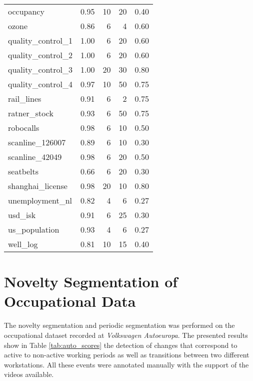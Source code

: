 \begin{table}
\begin{tabular}{lrrrr}
    occupancy &  0.95 &   10 &   20 &  0.40 \\
    ozone &  0.86 &    6 &    4 &  0.60 \\
    quality\_control\_1 &  1.00 &    6 &   20 &  0.60 \\
    quality\_control\_2 &  1.00 &    6 &   20 &  0.60 \\
    quality\_control\_3 &  1.00 &   20 &   30 &  0.80 \\
    quality\_control\_4 &  0.97 &   10 &   50 &  0.75 \\
    rail\_lines &  0.91 &    6 &    2 &  0.75 \\
    ratner\_stock &  0.93 &    6 &   50 &  0.75 \\
    robocalls &  0.98 &    6 &   10 &  0.50 \\
    scanline\_126007 &  0.89 &    6 &   10 &  0.30 \\
    scanline\_42049 &  0.98 &    6 &   20 &  0.50 \\
    seatbelts &  0.66 &    6 &   20 &  0.30 \\
    shanghai\_license &  0.98 &   20 &   10 &  0.80 \\
    unemployment\_nl &  0.82 &    4 &    6 &  0.27 \\
    usd\_isk &  0.91 &    6 &   25 &  0.30 \\
    us\_population &  0.93 &    4 &    6 &  0.27 \\
    well\_log &  0.81 &   10 &   15 &  0.40 \\
    \bottomrule
    \end{tabular}
\end{table}

\section{Novelty Segmentation of Occupational Data}
\label{append:novelty_occupational}

The novelty segmentation and periodic segmentation was performed on the occupational dataset recorded at \textit{Volkswagen Autoeuropa}. The presented results show in Table \ref{tab:auto_scores} the detection of changes that correspond to active to non-active working periods as well as transitions between two different workstations. All these events were annotated manually with the support of the videos available. 

